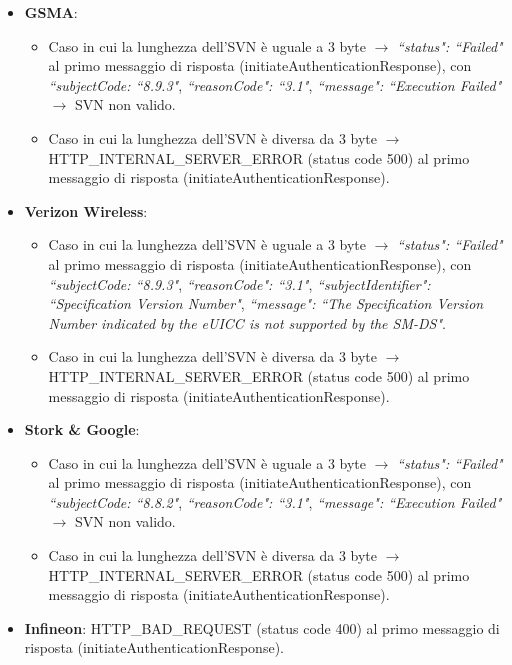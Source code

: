 \documentclass[10pt, oneside]{book}
\begin{document}
\begin{itemize}
\begin{itemize}
\end{itemize}
\item \textbf{GSMA}:
\begin{itemize}
\item Caso in cui la lunghezza dell'SVN è uguale a 3 byte $\rightarrow$ \textit{``status": ``Failed"} al primo messaggio di risposta (initiateAuthenticationResponse), con \textit{``subjectCode: ``8.9.3"}, \textit{``reasonCode": ``3.1"}, \textit{``message": ``Execution Failed"} $\rightarrow$ SVN non valido.
\item Caso in cui la lunghezza dell'SVN è diversa da 3 byte $\rightarrow$\\HTTP\_INTERNAL\_SERVER\_ERROR (status code 500) al primo messaggio di risposta (initiateAuthenticationResponse).
\end{itemize}
\item \textbf{Verizon Wireless}:
\begin{itemize}
\item Caso in cui la lunghezza dell'SVN è uguale a 3 byte $\rightarrow$ \textit{``status": ``Failed"} al primo messaggio di risposta (initiateAuthenticationResponse), con \textit{``subjectCode: ``8.9.3"}, \textit{``reasonCode": ``3.1"}, \textit{``subjectIdentifier": ``Specification Version Number"}, \textit{``message": ``The Specification Version Number indicated  by the eUICC is not supported by the SM-DS"}.
\item Caso in cui la lunghezza dell'SVN è diversa da 3 byte $\rightarrow$\\HTTP\_INTERNAL\_SERVER\_ERROR (status code 500) al primo messaggio di risposta (initiateAuthenticationResponse).
\end{itemize}
\item \textbf{Stork \& Google}:
\begin{itemize}
\item Caso in cui la lunghezza dell'SVN è uguale a 3 byte $\rightarrow$ \textit{``status": ``Failed"} al primo messaggio di risposta (initiateAuthenticationResponse), con \textit{``subjectCode: ``8.8.2"}, \textit{``reasonCode": ``3.1"}, \textit{``message": ``Execution Failed"} $\rightarrow$ SVN non valido.
\item Caso in cui la lunghezza dell'SVN è diversa da 3 byte $\rightarrow$\\HTTP\_INTERNAL\_SERVER\_ERROR (status code 500) al primo messaggio di risposta (initiateAuthenticationResponse).
\end{itemize}
\item \textbf{Infineon}: HTTP\_BAD\_REQUEST (status code 400) al primo messaggio di risposta (initiateAuthenticationResponse).

\end{itemize}
\end{document}
